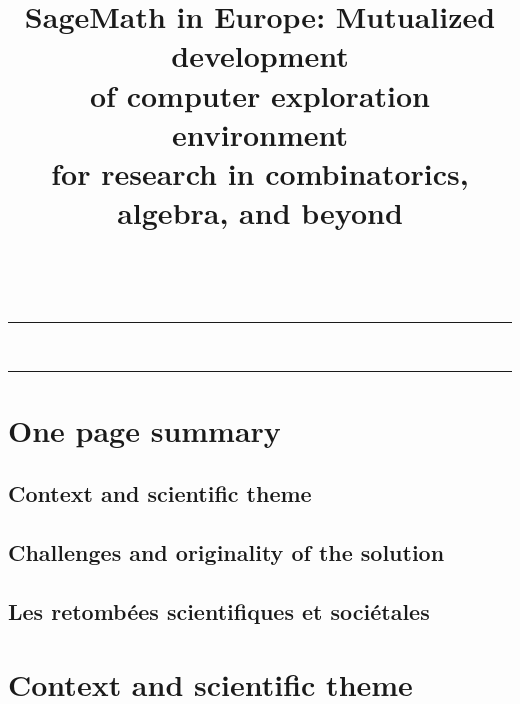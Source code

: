 \documentclass[a4,12pt]{amsart}
\title[SageMath in Europe]{SageMath in Europe: Mutualized development\\
  of computer exploration environment\\
  for research in combinatorics, algebra, and beyond
}
\date{}
\newcommand{\sage}{\href{http://www.sagemath.org/}{\texttt{Sage}}\xspace}
\newcommand{\TODO}[2][To do: ]{{\textcolor{red}{\textbf{#1#2}}}}
\begin{document}
\ \vspace{-1.5cm}
\hrule
\medskip
\maketitle
\ \vspace{-1cm}
\hrule




\section{One page summary}

\subsection{Context and scientific theme}

\subsection{Challenges and originality of the solution}

\subsection{Les retombées scientifiques et sociétales}

\clearpage

\section{Context and scientific theme}

\end{document}
